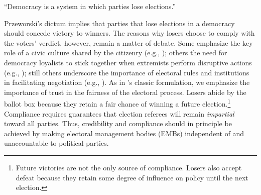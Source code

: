 \documentclass[12 pt, letter]{article}
\begin{document}

\begin{flushright}
\singlespacing
``Democracy is a system in which parties lose elections.'' \\ \citet[p. 10]{Przeworski1991}
\doublespacing
\end{flushright}

Przeworski's dictum implies that parties that lose elections in a
democracy should concede victory to winners.  The reasons why losers
choose to comply with the voters' verdict, however, remain a matter
of debate. Some emphasize the key role of a civic culture shared by
the citizenry (e.g., \citet{Putnam2000}); others the need for
democracy loyalists to stick together when extremists perform
disruptive actions (e.g., \citet{Linz1978}); still others underscore
the importance of electoral rules and institutions in facilitating
negotiation (e.g., \citet{Jones1995}).  As in
\citeauthor{Przeworski1991}'s classic formulation, we emphasize the
importance of trust in the fairness of the electoral process. Losers
abide by the ballot box because they retain a fair chance of winning
a future election.\footnote{Future victories are not the only source
of compliance. Losers also accept defeat because they retain some
degree of influence on policy until the next election.} Compliance
requires guarantees that election referees will remain
\emph{impartial} toward all parties.  Thus, credibility and
compliance should in principle be achieved by making electoral
management bodies (EMBs) independent of and unaccountable to
political parties.
\end{document}
